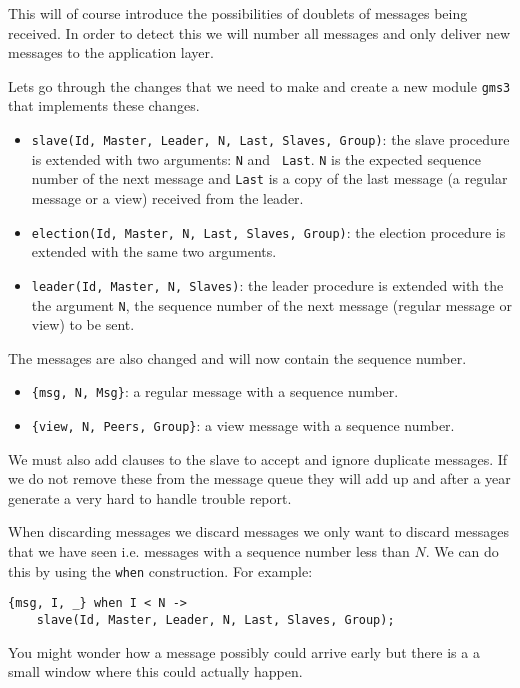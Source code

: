 \documentclass[a4paper,11pt]{article}
\begin{document}
This will of course introduce the possibilities of doublets of
messages being received. In order to detect this we will number all
messages and only deliver new messages to the application layer.

Lets go through the changes that we need to make and create a new
module {\tt gms3} that implements these changes.
 
\begin{itemize}
\item {\tt slave(Id, Master, Leader, N, Last, Slaves, Group)}: the slave
  procedure is extended with two arguments: {\tt N} and {\tt
    Last}. {\tt N} is the expected sequence number of the next message
  and {\tt Last} is a copy of the last message (a regular message or a
  view) received from the leader.
\item {\tt election(Id, Master, N, Last, Slaves, Group)}: the election
  procedure is extended with the same two arguments.
\item {\tt leader(Id, Master, N, Slaves)}: the leader procedure is
  extended with the the argument {\tt N}, the sequence number of the
  next message (regular message or view) to be sent.
\end{itemize}

The messages are also changed and will now contain the sequence number.

\begin{itemize}
\item {\tt \{msg, N, Msg\}}: a regular message with a sequence number.
\item {\tt \{view, N, Peers, Group\}}: a view message with a sequence number.
\end{itemize}

We must also add clauses to the slave to accept and ignore duplicate
messages. If we do not remove these from the message queue they will
add up and after a year generate a very hard to handle trouble report.

When discarding messages we discard messages we only want to discard
messages that we have seen i.e. messages with a sequence number less
than $N$. We can do this by using the {\tt when} construction. For example:

\begin{verbatim}
{msg, I, _} when I < N ->
    slave(Id, Master, Leader, N, Last, Slaves, Group);
\end{verbatim}

You might wonder how a message possibly could arrive early but there
is a a small window where this could actually happen.
\end{document}
